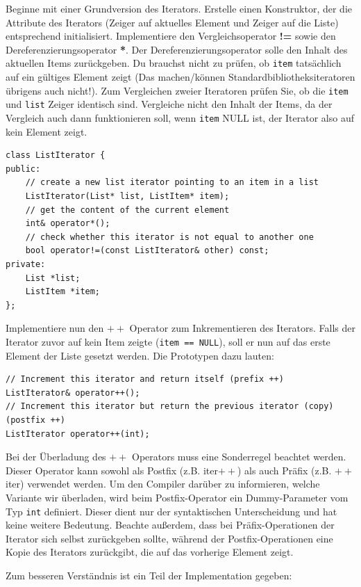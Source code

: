 Beginne mit einer Grundversion des Iterators.
Erstelle einen Konstruktor, der die Attribute des Iterators (Zeiger auf aktuelles Element und Zeiger auf die Liste) entsprechend initialisiert.
Implementiere den Vergleichsoperator \textbf{!=} sowie den Dereferenzierungsoperator \textbf{*}.
Der Dereferenzierungsoperator solle den Inhalt des aktuellen Items zurückgeben.
Du brauchst nicht zu prüfen, ob \texttt{item} tatsächlich auf ein gültiges Element zeigt (Das machen/können Standardbibliotheksiteratoren übrigens auch nicht!).
Zum Vergleichen zweier Iteratoren prüfen Sie, ob die \texttt{item} und \texttt{list} Zeiger identisch sind.
Vergleiche nicht den Inhalt der Items, da der Vergleich auch dann funktionieren soll, wenn \texttt{item} NULL ist, der Iterator also auf kein Element zeigt.

\begin{lstlisting}
class ListIterator {
public:
	// create a new list iterator pointing to an item in a list
	ListIterator(List* list, ListItem* item);
	// get the content of the current element
	int& operator*();
	// check whether this iterator is not equal to another one
	bool operator!=(const ListIterator& other) const;
private:
	List *list;
	ListItem *item;
};
\end{lstlisting}


Implementiere nun den \textbf{$++$} Operator zum Inkrementieren des Iterators.
Falls der Iterator zuvor auf kein Item zeigte (\texttt{item == NULL}), soll er nun auf das erste Element der Liste gesetzt werden.
Die Prototypen dazu lauten:
\begin{lstlisting}
// Increment this iterator and return itself (prefix ++)
ListIterator& operator++();
// Increment this iterator but return the previous iterator (copy) (postfix ++)
ListIterator operator++(int);
\end{lstlisting}

Bei der Überladung des \textbf{$++$} Operators muss eine Sonderregel beachtet werden.
Dieser Operator kann sowohl als Postfix (z.B. iter$++$) als auch Präfix (z.B. $++$iter) verwendet werden.
Um den Compiler darüber zu informieren, welche Variante wir überladen, wird beim Postfix-Operator ein Dummy-Parameter vom Typ \texttt{int} definiert.
Dieser dient nur der syntaktischen Unterscheidung und hat keine weitere Bedeutung.
Beachte außerdem, dass bei Präfix-Operationen der Iterator sich selbst zurückgeben sollte, während der Postfix-Operationen eine Kopie des Iterators zurückgibt, die auf das vorherige Element zeigt.

Zum besseren Verständnis ist ein Teil der Implementation gegeben:

